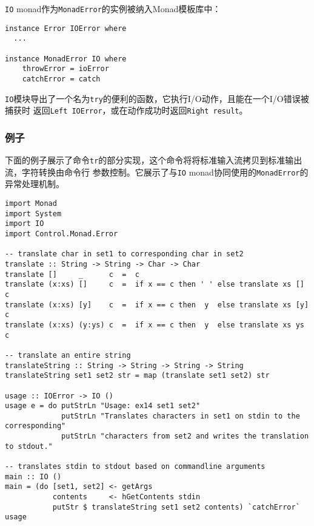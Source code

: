 \noindent{}\texttt{IO} monad作为\texttt{MonadError}的实例被纳入Monad模板库中：
\vspace{-0.2em}
\begin{verbatim}
instance Error IOError where
  ...

instance MonadError IO where
    throwError = ioError
    catchError = catch
\end{verbatim}
\noindent{}\texttt{IO}模块导出了一个名为\texttt{try}的便利的函数，它执行I/O动作，且能在一个I/O错误被捕获时
返回\texttt{Left IOError}，或在动作成功时返回\texttt{Right result}。

\vspace{-0.5em}
\subsubsection{例子}
\vspace{-0.5em}
\indent{}下面的例子展示了命令\texttt{tr}的部分实现，这个命令将将标准输入流拷贝到标准输出流，字符转换由命令行
参数控制。它展示了与\texttt{IO} monad协同使用的\texttt{MonadError}的异常处理机制。
\vspace{-0.5em}
\begin{verbatim}
import Monad
import System
import IO
import Control.Monad.Error

-- translate char in set1 to corresponding char in set2
translate :: String -> String -> Char -> Char
translate []     _      c  =  c
translate (x:xs) []     c  =  if x == c then ' ' else translate xs []  c
translate (x:xs) [y]    c  =  if x == c then  y  else translate xs [y] c
translate (x:xs) (y:ys) c  =  if x == c then  y  else translate xs ys  c

-- translate an entire string
translateString :: String -> String -> String -> String
translateString set1 set2 str = map (translate set1 set2) str

usage :: IOError -> IO ()
usage e = do putStrLn "Usage: ex14 set1 set2"
             putStrLn "Translates characters in set1 on stdin to the corresponding"
             putStrLn "characters from set2 and writes the translation to stdout."

-- translates stdin to stdout based on commandline arguments
main :: IO ()
main = (do [set1, set2] <- getArgs
           contents     <- hGetContents stdin
           putStr $ translateString set1 set2 contents) `catchError` usage
\end{verbatim}
\clearpage

